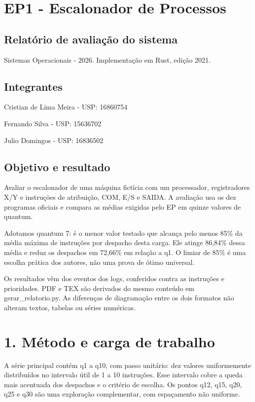 \documentclass[10pt,a4paper]{article}
\begin{document}
\section*{EP1 - Escalonador de Processos}
\subsection*{Relatório de avaliação do sistema}
Sistemas Operacionais - 2026. Implementação em Rust, edição 2021.

\subsection*{Integrantes}
Cristian de Lima Meira - USP: 16860754

Fernando Silva - USP: 15636702

Julio Domingos - USP: 16836502

\subsection*{Objetivo e resultado}
Avaliar o escalonador de uma máquina fictícia com um processador, registradores X/Y e instruções de atribuição, COM, E/S e SAIDA. A avaliação usa os dez programas oficiais e compara as médias exigidas pelo EP em quinze valores de quantum.

Adotamos quantum 7: é o menor valor testado que alcança pelo menos 85\% da média máxima de instruções por despacho desta carga. Ele atinge 86,84\% dessa média e reduz os despachos em 72,66\% em relação a q1. O limiar de 85\% é uma escolha prática dos autores, não uma prova de ótimo universal.

Os resultados vêm dos eventos dos logs, conferidos contra as instruções e prioridades. PDF e TEX são derivados do mesmo conteúdo em gerar\_relatorio.py. As diferenças de diagramação entre os dois formatos não alteram textos, tabelas ou séries numéricas.

\clearpage
\section*{1. Método e carga de trabalho}
A série principal contém q1 a q10, com passo unitário: dez valores uniformemente distribuídos no intervalo útil de 1 a 10 instruções. Esse intervalo cobre a queda mais acentuada dos despachos e o critério de escolha. Os pontos q12, q15, q20, q25 e q30 são uma exploração complementar, com espaçamento não uniforme.
\end{document}
